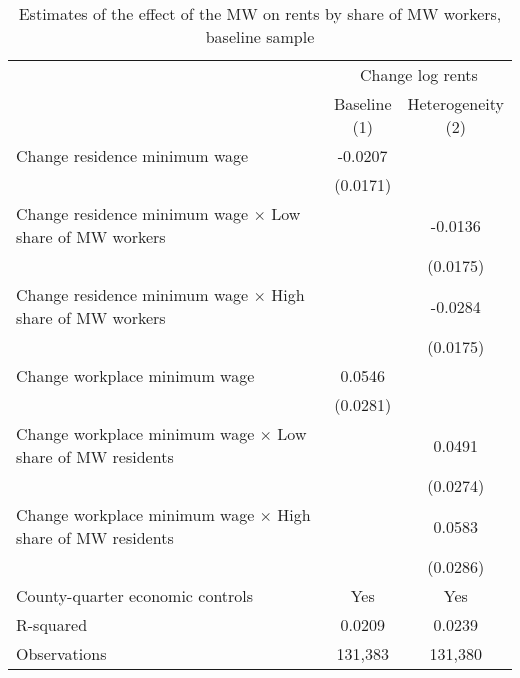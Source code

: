 \begin{table}[hbt!] \centering
    \caption{Estimates of the effect of the MW on rents by share of MW workers, baseline sample}
    \label{tab:het_mw_shares}
    \begin{tabular}{@{}lcc@{}}
        \toprule
            & \multicolumn{2}{c}{Change log rents}                                         \\ \cmidrule(l){2-3} 
            & \shortstack{Baseline \\(1)} 
            & \shortstack{Heterogeneity \\(2)}                                             \\ \midrule
        Change residence minimum wage                                     &  -0.0207   &       \\
                                                                          & (0.0171)  &       \\
        Change residence minimum wage $\times$ Low share of MW workers    &        &  -0.0136  \\ 
                                                                          &        & (0.0175) \\   
        Change residence minimum wage $\times$ High share of MW workers   &        &  -0.0284  \\
                                                                          &        & (0.0175) \\
        Change workplace minimum wage                                     &  0.0546   &       \\
                                                                          & (0.0281)  &       \\
        Change workplace minimum wage $\times$ Low share of MW residents  &        &  0.0491  \\
                                                                          &        & (0.0274) \\
        Change workplace minimum wage $\times$ High share of MW residents &        &  0.0583  \\
                                                                          &        & (0.0286) \\
        County-quarter economic controls                                  &  Yes   &  Yes  \\
        R-squared                                                         &  0.0209   &  0.0239  \\
        Observations                                                      &  131,383  &  131,380 \\ \bottomrule
    \end{tabular}


\end{table}

